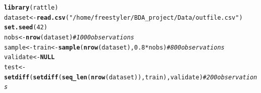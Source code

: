 \documentclass{article}\usepackage[]{graphicx}\usepackage[]{color}
\makeatletter
\newcommand{\hlnum}[1]{\textcolor[rgb]{0.686,0.059,0.569}{#1}}%
\newcommand{\hlstr}[1]{\textcolor[rgb]{0.192,0.494,0.8}{#1}}%
\newcommand{\hlcom}[1]{\textcolor[rgb]{0.678,0.584,0.686}{\textit{#1}}}%
\newcommand{\hlopt}[1]{\textcolor[rgb]{0,0,0}{#1}}%
\newcommand{\hlstd}[1]{\textcolor[rgb]{0.345,0.345,0.345}{#1}}%
\newcommand{\hlkwa}[1]{\textcolor[rgb]{0.161,0.373,0.58}{\textbf{#1}}}%
\newcommand{\hlkwb}[1]{\textcolor[rgb]{0.69,0.353,0.396}{#1}}%
\newcommand{\hlkwd}[1]{\textcolor[rgb]{0.737,0.353,0.396}{\textbf{#1}}}%
\newenvironment{kframe}{%
 \def\at@end@of@kframe{}%
 \ifinner\ifhmode%
  \def\at@end@of@kframe{\end{minipage}}%
  \begin{minipage}{\columnwidth}%
 \fi\fi%
 \def\FrameCommand##1{\hskip\@totalleftmargin \hskip-\fboxsep
 \colorbox{shadecolor}{##1}\hskip-\fboxsep
     \hskip-\linewidth \hskip-\@totalleftmargin \hskip\columnwidth}%
 \MakeFramed {\advance\hsize-\width
   \@totalleftmargin\z@ \linewidth\hsize
   \@setminipage}}%
 {\par\unskip\endMakeFramed%
 \at@end@of@kframe}
\newenvironment{knitrout}{}{} %
\makeatother
\begin{document}
\begin{knitrout}
\color{fgcolor}\begin{kframe}
\begin{alltt}
\hlkwd{library}\hlstd{(rattle)}
\hlstd{dataset}\hlkwb{<-}\hlkwd{read.csv}\hlstd{(}\hlstr{"/home/freestyler/BDA_project/Data/outfile.csv"}\hlstd{)}
\hlkwd{set.seed}\hlstd{(}\hlnum{42}\hlstd{)}
\hlstd{nobs} \hlkwb{<-} \hlkwd{nrow}\hlstd{(dataset)} \hlcom{# 1000 observations }
\hlstd{sample} \hlkwb{<-} \hlstd{train} \hlkwb{<-} \hlkwd{sample}\hlstd{(}\hlkwd{nrow}\hlstd{(dataset),} \hlnum{0.8}\hlopt{*}\hlstd{nobs)} \hlcom{# 800 observations}
\hlstd{validate} \hlkwb{<-} \hlkwa{NULL}
\hlstd{test} \hlkwb{<-} \hlkwd{setdiff}\hlstd{(}\hlkwd{setdiff}\hlstd{(}\hlkwd{seq_len}\hlstd{(}\hlkwd{nrow}\hlstd{(dataset)), train), validate)} \hlcom{# 200 observations}
\end{alltt}
\end{kframe}
\end{knitrout}
\end{document}
